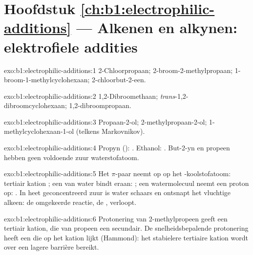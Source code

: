 \section*{Hoofdstuk \ref{ch:b1:electrophilic-additions} --- Alkenen en alkynen: elektrofiele addities}

\begin{solution}{exo:b1:electrophilic-additions:1}
2-Chloorpropaan; 2-broom-2-methylpropaan; 1-broom-1-methylcyclohexaan;
2-chloorbut-2-een.
\end{solution}

\begin{solution}{exo:b1:electrophilic-additions:2}
1,2-Dibroomethaan; \textit{trans}-1,2-dibroomcyclohexaan;
1,2-dibroompropaan.
\end{solution}

\begin{solution}{exo:b1:electrophilic-additions:3}
Propaan-2-ol; 2-methylpropaan-2-ol; 1-methylcyclohexaan-1-ol (telkens
Markovnikov).
\end{solution}

\begin{solution}{exo:b1:electrophilic-additions:4}
Propyn (): . Ethanol:
. But-2-yn en propeen hebben geen
voldoende zuur waterstofatoom.
\end{solution}

\begin{solution}{exo:b1:electrophilic-additions:5}
Het $\pi$-paar neemt  op op het -koolstofatoom: tertiair
kation ; een  van water bindt eraan:
; een watermolecuul neemt een proton op: .
In heet geconcentreerd zuur is water schaars en ontsnapt het vluchtige
alkeen: de omgekeerde reactie, de , verloopt.
\end{solution}

\begin{solution}{exo:b1:electrophilic-additions:6}
Protonering van 2-methylpropeen geeft een tertiair kation, die van
propeen een secundair. De snelheidsbepalende protonering heeft een
 die op het kation lijkt (Hammond): het stabielere
tertiaire kation wordt over een lagere barrière bereikt.
\end{solution}

